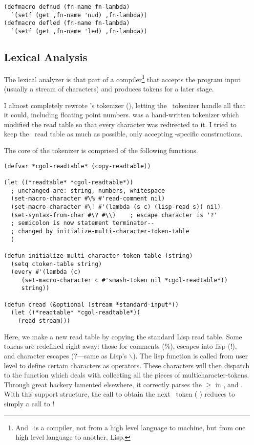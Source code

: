 {\footnotesize\begin{verbatim}
(defmacro defnud (fn-name fn-lambda)
  `(setf (get ,fn-name 'nud) ,fn-lambda))
(defmacro defled (fn-name fn-lambda)
  `(setf (get ,fn-name 'led) ,fn-lambda))
\end{verbatim}}


\subsection {Lexical Analysis}

The lexical analyzer is that part of a compiler\footnote{And \cgol\ is a
compiler, not from a high level language to machine, but from one high
level language to another, Lisp.} that accepts the program input (usually a
stream of characters) and produces tokens for a later stage.

I almost completely rewrote \cgol's tokenizer (), letting the
\cl\ tokenizer handle all that it could, including floating point numbers.
 was a hand-written tokenizer which modified the read table
so that every character was redirected to it.  I tried to keep the \cl\ read
table as much as possible, only accepting \cgol-specific constructions.

The core of the tokenizer is comprised of the following functions.

{\footnotesize\begin{verbatim}
(defvar *cgol-readtable* (copy-readtable))

(let ((*readtable* *cgol-readtable*))
  ; unchanged are: string, numbers, whitespace 
  (set-macro-character #\% #'read-comment nil)
  (set-macro-character #\! #'(lambda (s c) (lisp-read s)) nil)
  (set-syntax-from-char #\? #\\)	; escape character is '?'
  ; semicolon is now statement terminator--
  ; changed by initialize-multi-character-token-table
  )

(defun initialize-multi-character-token-table (string)
  (setq ctoken-table string)
  (every #'(lambda (c)
     (set-macro-character c #'smash-token nil *cgol-readtable*))
     string))

(defun cread (&optional (stream *standard-input*))
  (let ((*readtable* *cgol-readtable*))
    (read stream)))
\end{verbatim}}

Here, we make a new read table by copying the standard Lisp read table.
Some tokens are redefined right away: those for comments (\%), escapes into
lisp (!), and character escapes (?---same as Lisp's $\backslash$).  The
lisp function  is called from user
level to define certain characters as operators. These characters will then
dispatch to the function  which deals with collecting all
the pieces of multicharacter-tokens.  Through great hackery lamented
elsewhere, it correctly parses the $\geq$ in , and .
With this support structure, the call to obtain the next \cgol\ token
( ) reduces to simply a call to
!

